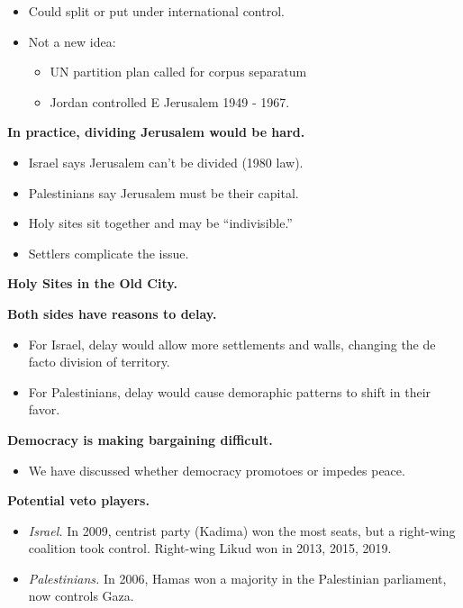 \documentclass{article}
\begin{document}
\begin{itemize}
  \item Could split or put under international control.
  \item Not a new idea:
    \begin{itemize}
      \item UN partition plan called for corpus separatum
      \item Jordan controlled E Jerusalem 1949 - 1967.
    \end{itemize}
\end{itemize}

{\bf In practice, dividing Jerusalem would be hard.}

\begin{itemize}
  \item Israel says Jerusalem can't be divided (1980 law).
  \item Palestinians say Jerusalem must be their capital.
  \item Holy sites sit together and may be ``indivisible.''
  \item Settlers complicate the issue.
\end{itemize}

{\bf Holy Sites in the Old City.}

{\bf Both sides have reasons to delay.}

\begin{itemize}
  \item For Israel, delay would allow more settlements and walls, changing the de facto division of territory.
  \item For Palestinians, delay would cause demoraphic patterns to shift in their favor.
\end{itemize}

{\bf Democracy is making bargaining difficult.}

\begin{itemize}
  \item We have discussed whether democracy promotoes or impedes peace.
\end{itemize}

{\bf Potential veto players.}

\begin{itemize}
  \item {\it Israel.} In 2009, centrist party (Kadima) won the most seats, but a right-wing coalition took control.  Right-wing Likud won in 2013, 2015, 2019.
  \item {\it Palestinians.} In 2006, Hamas won a majority in the Palestinian parliament, now controls Gaza.
\end{itemize}
\end{document}
